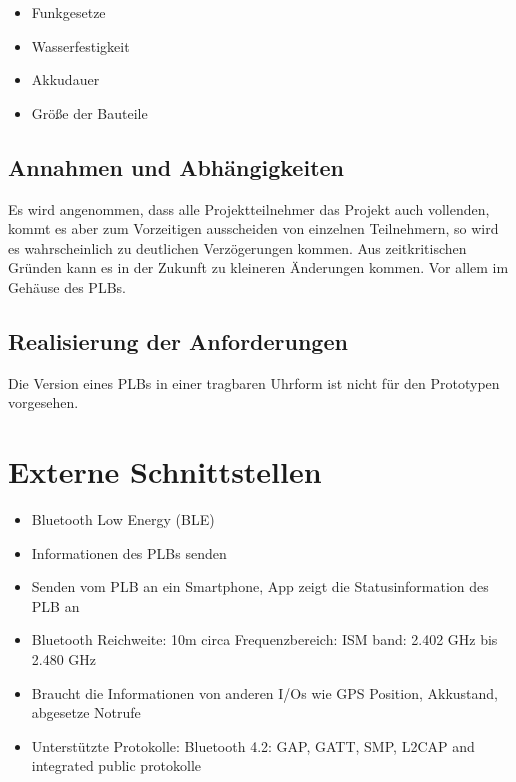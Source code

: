 \begin{itemize}
	\item Funkgesetze
	\item Wasserfestigkeit
	\item Akkudauer 
	\item Größe der Bauteile 
\end{itemize}

\subsection{Annahmen und Abhängigkeiten}
Es wird angenommen, dass alle Projektteilnehmer das Projekt auch vollenden, kommt es aber zum Vorzeitigen ausscheiden von einzelnen Teilnehmern, so wird es wahrscheinlich zu deutlichen Verzögerungen kommen. Aus zeitkritischen Gründen kann es in der Zukunft zu kleineren Änderungen kommen. Vor allem im Gehäuse des PLBs.

\subsection{Realisierung der Anforderungen}
Die Version eines PLBs in einer tragbaren Uhrform ist nicht für den Prototypen vorgesehen.

\newpage

\section{Externe Schnittstellen}

\begin{itemize}
	\item Bluetooth Low Energy (BLE)
	\item Informationen des PLBs senden
	\item Senden vom PLB an ein Smartphone, App zeigt die Statusinformation des PLB an
	\item Bluetooth Reichweite: 10m circa Frequenzbereich: ISM band: 2.402 GHz bis 2.480 GHz
	\item Braucht die Informationen von anderen I/Os wie GPS Position, Akkustand, abgesetze Notrufe
	\item Unterstützte Protokolle: Bluetooth 4.2: GAP, GATT, SMP, L2CAP and integrated public protokolle
\end{itemize}

